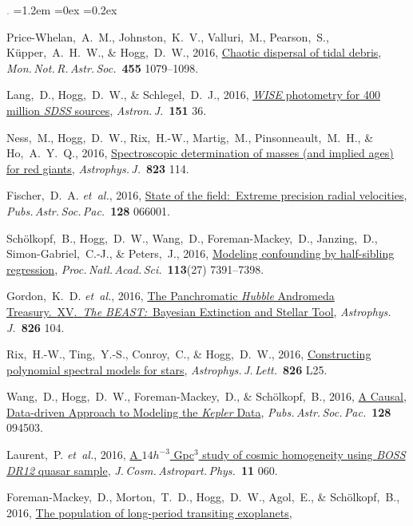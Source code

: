 \documentclass[10pt,letterpaper]{article}
\newcommand{\acronym}[1]{{\small{#1}}}
\newcommand{\foreign}[1]{\textsl{#1}}
\newcommand{\etal}{\foreign{et~al.}}
\newcommand{\project}[1]{\textsl{#1}}
\newcommand{\doi}[2]{\href{http://dx.doi.org/#1}{{#2}}}
\newcommand{\deemph}[1]{\textcolor{grey}{\footnotesize{#1}}}
\newcommand{\pubnumber}[1]{\deemph{{#1}.}}
\newcounter{refpubnum}
\newcommand{\hogglist}{%
    \rightmargin=0in
    \leftmargin=1.2em
    \topsep=0ex
    \partopsep=0pt
    \itemsep=0.2ex
    \parsep=0pt
    \itemindent=-1.0\leftmargin
    \listparindent=0.0\leftmargin
    \settowidth{\labelsep}{~}
    \usecounter{refpubnum}
  }
\begin{document}
\begin{list}{\pubnumber{\therefpubnum}}{\hogglist}
\item
Price-Whelan,~A.~M., Johnston,~K.~V., Valluri,~M., Pearson,~S.,
K\"upper,~A.~H.~W., \& Hogg,~D.~W., 2016,
\doi{10.1093/mnras/stv2383}{Chaotic dispersal of tidal debris},
\textit{Mon.\,Not.\,R.\,Astr.\,Soc.}\ \textbf{455} 1079--1098.
\item
Lang,~D., Hogg,~D.~W., \& Schlegel,~D.~J., 2016,
\doi{10.3847/0004-6256/151/2/36}{\project{WISE} photometry for 400 million \project{SDSS} sources},
\textit{Astron.\,J.}\ \textbf{151} 36.
\item
Ness,~M., Hogg,~D.~W., Rix,~H.-W., Martig,~M., Pinsonneault,~M.~H., \& Ho,~A.~Y.~Q., 2016,
\doi{10.3847/0004-637X/823/2/114}{Spectroscopic determination of masses (and implied ages) for red giants},
\textit{Astrophys.\,J.}\ \textbf{823} 114.
\item
Fischer,~D.~A. \etal, 2016,
\doi{10.1088/1538-3873/128/964/066001}{State of the field:\ Extreme precision radial velocities},
\textit{Pubs.\,Astr.\,Soc.\,Pac.}\ \textbf{128} 066001.
\item
Sch\"olkopf,~B., Hogg,~D.~W., Wang,~D., Foreman-Mackey,~D., Janzing,~D., Simon-Gabriel,~C.-J., \& Peters,~J., 2016,
\doi{10.1073/pnas.1511656113}{Modeling confounding by half-sibling regression},
\textit{Proc.\,Natl.\,Acad.\,Sci.}\ \textbf{113}(27) 7391--7398.
\item
Gordon,~K.~D. \etal, 2016,
\doi{10.3847/0004-637X/826/2/104}{The Panchromatic \project{Hubble} Andromeda Treasury.\ \acronym{XV}.\
\project{The BEAST:}\ Bayesian Extinction and Stellar Tool},
\textit{Astrophys.\,J.}\ \textbf{826} 104.
\item
Rix,~H.-W., Ting,~Y.-S., Conroy,~C., \& Hogg,~D.~W., 2016,
\doi{10.3847/2041-8205/826/2/L25}{Constructing polynomial spectral models for stars},
\textit{Astrophys.\,J.\,Lett.}\ \textbf{826} L25.
\item
Wang,~D., Hogg,~D.~W., Foreman-Mackey,~D., \& Sch\"olkopf,~B., 2016,
\doi{10.1088/1538-3873/128/967/094503}{A Causal, Data-driven Approach to Modeling the \project{Kepler} Data},
\textit{Pubs.\,Astr.\,Soc.\,Pac.}\ \textbf{128} 094503.
\item
Laurent,~P. \etal, 2016,
\doi{10.1088/1475-7516/2016/11/060}{A $14 h^{-3}$ Gpc$^3$ study of cosmic homogeneity using \project{BOSS DR12} quasar sample},
\textit{J.\,Cosm.\,Astropart.\,Phys.}\ \textbf{11} 060.
\item
Foreman-Mackey,~D., Morton,~T.~D., Hogg,~D.~W., Agol,~E., \& Sch\"olkopf,~B., 2016,
\doi{10.3847/0004-6256/152/6/206}{The population of long-period transiting exoplanets},

\end{list}
\end{document}
